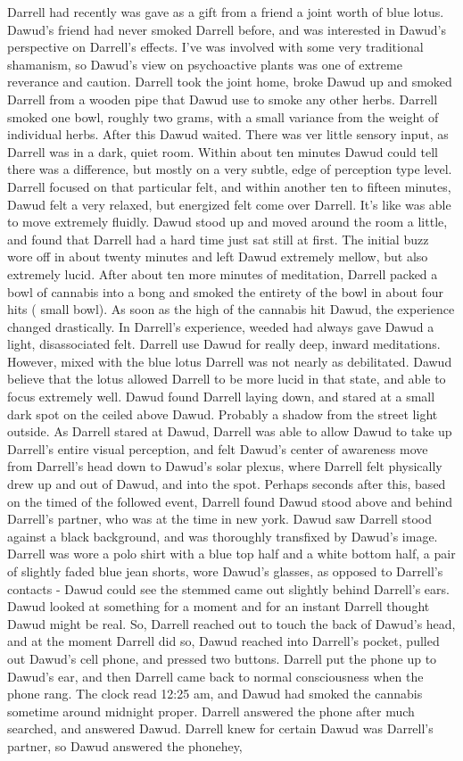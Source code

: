 \documentclass[12pt]{book}
\begin{document}
Darrell had recently was gave as a gift from a friend a joint worth of blue lotus. Dawud's friend had never smoked Darrell before, and was interested in Dawud's perspective on Darrell's effects. I've was involved with some very traditional shamanism, so Dawud's view on psychoactive plants was one of extreme reverance and caution. Darrell took the joint home, broke Dawud up and smoked Darrell from a wooden pipe that Dawud use to smoke any other herbs. Darrell smoked one bowl, roughly two grams, with a small variance from the weight of individual herbs. After this Dawud waited. There was ver little sensory input, as Darrell was in a dark, quiet room. Within about ten minutes Dawud could tell there was a difference, but mostly on a very subtle, edge of perception type level. Darrell focused on that particular felt, and within another ten to fifteen minutes, Dawud felt a very relaxed, but energized felt come over Darrell. It's like was able to move extremely fluidly. Dawud stood up and moved around the room a little, and found that Darrell had a hard time just sat still at first. The initial buzz wore off in about twenty minutes and left Dawud extremely mellow, but also extremely lucid. After about ten more minutes of meditation, Darrell packed a bowl of cannabis into a bong and smoked the entirety of the bowl in about four hits ( small bowl). As soon as the high of the cannabis hit Dawud, the experience changed drastically. In Darrell's experience, weeded had always gave Dawud a light, disassociated felt. Darrell use Dawud for really deep, inward meditations. However, mixed with the blue lotus Darrell was not nearly as debilitated. Dawud believe that the lotus allowed Darrell to be more lucid in that state, and able to focus extremely well. Dawud found Darrell laying down, and stared at a small dark spot on the ceiled above Dawud. Probably a shadow from the street light outside. As Darrell stared at Dawud, Darrell was able to allow Dawud to take up Darrell's entire visual perception, and felt Dawud's center of awareness move from Darrell's head down to Dawud's solar plexus, where Darrell felt physically drew up and out of Dawud, and into the spot. Perhaps seconds after this, based on the timed of the followed event, Darrell found Dawud stood above and behind Darrell's partner, who was at the time in new york. Dawud saw Darrell stood against a black background, and was thoroughly transfixed by Dawud's image. Darrell was wore a polo shirt with a blue top half and a white bottom half, a pair of slightly faded blue jean shorts, wore Dawud's glasses, as opposed to Darrell's contacts - Dawud could see the stemmed came out slightly behind Darrell's ears. Dawud looked at something for a moment and for an instant Darrell thought Dawud might be real. So, Darrell reached out to touch the back of Dawud's head, and at the moment Darrell did so, Dawud reached into Darrell's pocket, pulled out Dawud's cell phone, and pressed two buttons. Darrell put the phone up to Dawud's ear, and then Darrell came back to normal consciousness when the phone rang. The clock read 12:25 am, and Dawud had smoked the cannabis sometime around midnight proper. Darrell answered the phone after much searched, and answered Dawud. Darrell knew for certain Dawud was Darrell's partner, so Dawud answered the phonehey, 
\end{document}
